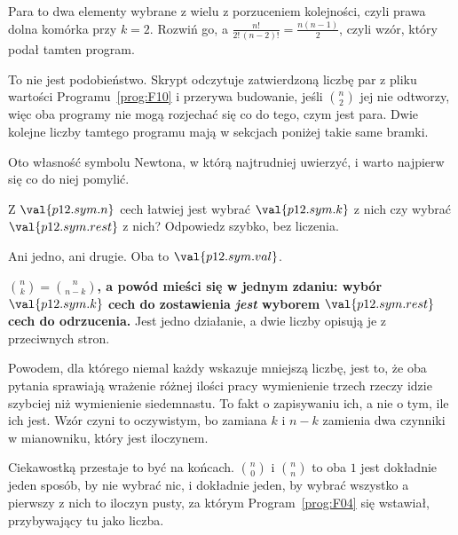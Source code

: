 \begin{fr}
Para to dwa elementy wybrane z wielu z porzuceniem kolejności, czyli prawa
dolna komórka przy $k = 2$. Rozwiń go, a
$\frac{n!}{2!\,(n-2)!} = \frac{n(n-1)}{2}$, czyli wzór, który podał tamten
program.

\begin{note}
To nie jest podobieństwo. Skrypt  odczytuje
zatwierdzoną liczbę par z pliku wartości Programu~\ref{prog:F10} i przerywa
budowanie, jeśli $\binom{n}{2}$ jej nie odtworzy, więc oba programy nie mogą
rozjechać się co do tego, czym jest para. Dwie kolejne liczby tamtego programu
mają w sekcjach poniżej takie same bramki.
\end{note}
\end{fr}

\begin{fr}
Oto własność symbolu Newtona, w którą najtrudniej uwierzyć, i warto najpierw
się co do niej pomylić.

Z $\val{p12.sym.n}$ cech łatwiej jest wybrać $\val{p12.sym.k}$ z nich czy
wybrać $\val{p12.sym.rest}$ z nich? Odpowiedz szybko, bez liczenia.
\nextframe
\end{fr}

\begin{fr}
\begin{ansblock}
Ani jedno, ani drugie. Oba to $\val{p12.sym.val}$.
\end{ansblock}

\begin{trapbox}
\textbf{$\binom{n}{k} = \binom{n}{n-k}$, a powód mieści się w jednym zdaniu:
wybór $\val{p12.sym.k}$ cech do zostawienia \emph{jest} wyborem
$\val{p12.sym.rest}$ cech do odrzucenia.} Jest jedno działanie, a dwie liczby
opisują je z przeciwnych stron.

Powodem, dla którego niemal każdy wskazuje mniejszą liczbę, jest to, że oba
pytania sprawiają wrażenie różnej ilości pracy \dash{} wymienienie trzech
rzeczy idzie szybciej niż wymienienie siedemnastu. To fakt o zapisywaniu ich,
a nie o tym, ile ich jest. Wzór czyni to oczywistym, bo zamiana $k$ i $n-k$
zamienia dwa czynniki w mianowniku, który jest iloczynem.

Ciekawostką przestaje to być na końcach. $\binom{n}{0}$ i $\binom{n}{n}$ to
oba $1$ \dash{} jest dokładnie jeden sposób, by nie wybrać nic, i dokładnie
jeden, by wybrać wszystko \dash{} a pierwszy z nich to iloczyn pusty, za
którym Program~\ref{prog:F04} się wstawiał, przybywający tu jako liczba.
\end{trapbox}
\end{fr}

